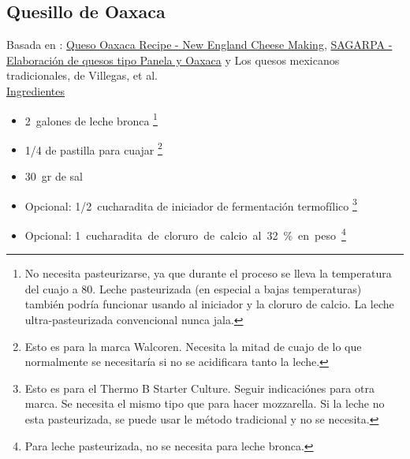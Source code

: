 \subsection{Quesillo de Oaxaca}

Basada en : \href{https://cheesemaking.com/products/queso-oaxaca-recipe}{Queso Oaxaca Recipe - New England Cheese Making}, \href{http://www.sagarpa.gob.mx/desarrolloRural/Documents/fichasaapt/Elaboraci%C3%B3n%20de%20quesos.pdf}{SAGARPA - Elaboración de quesos tipo Panela y Oaxaca} y Los quesos mexicanos tradicionales, de Villegas, et al. \\

\underline{Ingredientes}
\begin{itemize}
\item \SI{2}{galones} de leche bronca \footnote{No necesita pasteurizarse, ya que durante el proceso se lleva la temperatura del cuajo a 80. Leche pasteurizada (en especial a bajas temperaturas) también podría funcionar usando al iniciador y la cloruro de calcio. La leche ultra-pasteurizada convencional nunca jala.}
\item \num{1/4} de pastilla para cuajar \footnote{Esto es para la marca Walcoren. Necesita la mitad de cuajo de lo que normalmente se necesitaría si no se acidificara tanto la leche.} 
\item \SI{30}{gr} de sal
\item Opcional: \SI{1/2}{cucharadita} de iniciador de fermentación termofílico \footnote{Esto es para el Thermo B Starter Culture. Seguir indicaciónes para otra marca. Se necesita el mismo tipo que para hacer mozzarella. Si la leche no esta pasteurizada, se puede usar le método tradicional y no se necesita.}
\item Opcional: \SI{1} cucharadita de cloruro de calcio al 32\% en peso \footnote{Para leche pasteurizada, no se necesita para leche bronca.}
\end{itemize}


